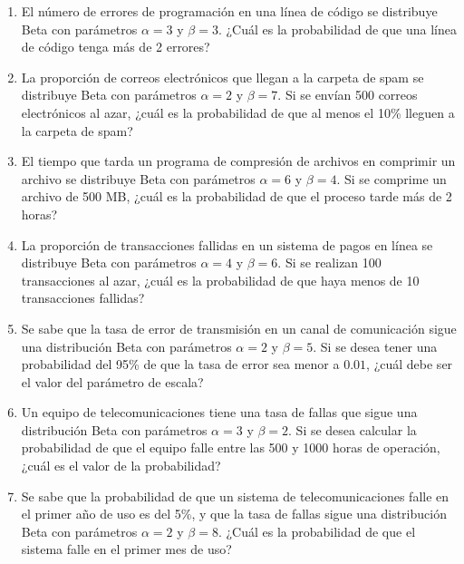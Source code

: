 \begin{Ejer}
\begin{enumerate}
\item El número de errores de programación en una línea de código se distribuye Beta con parámetros $\alpha=3$ y $\beta=3$. ¿Cuál es la probabilidad de que una línea de código tenga más de 2 errores?

\item La proporción de correos electrónicos que llegan a la carpeta de spam se distribuye Beta con parámetros $\alpha=2$ y $\beta=7$. Si se envían 500 correos electrónicos al azar, ¿cuál es la probabilidad de que al menos el 10\% lleguen a la carpeta de spam?

\item El tiempo que tarda un programa de compresión de archivos en comprimir un archivo se distribuye Beta con parámetros $\alpha=6$ y $\beta=4$. Si se comprime un archivo de 500 MB, ¿cuál es la probabilidad de que el proceso tarde más de 2 horas?

\item La proporción de transacciones fallidas en un sistema de pagos en línea se distribuye Beta con parámetros $\alpha=4$ y $\beta=6$. Si se realizan 100 transacciones al azar, ¿cuál es la probabilidad de que haya menos de 10 transacciones fallidas?

\item Se sabe que la tasa de error de transmisión en un canal de comunicación sigue una distribución Beta con parámetros $\alpha=2$ y $\beta=5$. Si se desea tener una probabilidad del 95\% de que la tasa de error sea menor a $0.01$, ¿cuál debe ser el valor del parámetro de escala?

\item Un equipo de telecomunicaciones tiene una tasa de fallas que sigue una distribución Beta con parámetros $\alpha=3$ y $\beta=2$. Si se desea calcular la probabilidad de que el equipo falle entre las 500 y 1000 horas de operación, ¿cuál es el valor de la probabilidad?

\item Se sabe que la probabilidad de que un sistema de telecomunicaciones falle en el primer año de uso es del 5\%, y que la tasa de fallas sigue una distribución Beta con parámetros $\alpha=2$ y $\beta=8$. ¿Cuál es la probabilidad de que el sistema falle en el primer mes de uso?


\end{enumerate}
\end{Ejer} 


